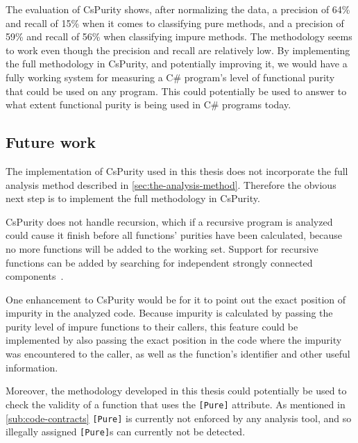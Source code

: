 \documentclass[a4paper,12pt]{article}
\begin{document}
The evaluation of CsPurity shows, after normalizing the data, a precision of 64\% and recall of 15\% when it comes to classifying pure methods, and a precision of 59\% and recall of 56\% when classifying impure methods. The methodology seems to work even though the precision and recall are relatively low. By implementing the full methodology in CsPurity, and potentially improving it, we would have a fully working system for measuring a C\# program's level of functional purity that could be used on any program. This could potentially be used to answer to what extent functional purity is being used in C\# programs today.


\subsection{Future work} \label{sub:future-work}

The implementation of CsPurity used in this thesis does not incorporate the full analysis method described in \autoref{sec:the-analysis-method}. Therefore the obvious next step is to implement the full methodology in CsPurity.

CsPurity does not handle recursion, which if a recursive program is analyzed could cause it finish before all functions' purities have been calculated, because no more functions will be added to the working set. Support for recursive functions can be added by searching for independent strongly connected components~\cite{pitidis2010purity}.

One enhancement to CsPurity would be for it to point out the exact position of impurity in the analyzed code. Because impurity is calculated by passing the purity level of impure functions to their callers, this feature could be implemented by also passing the exact position in the code where the impurity was encountered to the caller, as well as the function's identifier and other useful information. %

Moreover, the methodology developed in this thesis could potentially be used to check the validity of a function that uses the \texttt{[Pure]} attribute. As mentioned in \autoref{sub:code-contracts} \texttt{[Pure]} is currently not enforced by any analysis tool, and so illegally assigned \texttt{[Pure]}s can currently not be detected.
\end{document}
